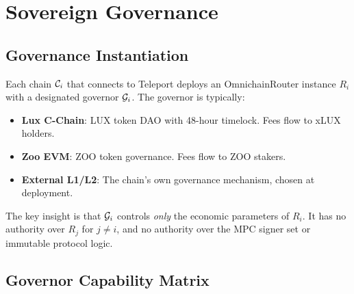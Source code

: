 \section{Sovereign Governance}

\label{sec:governance}

\subsection{Governance Instantiation}

Each chain $\mathcal{C}_i$ that connects to Teleport deploys an OmnichainRouter instance $R_i$ with a designated governor $\mathcal{G}_i$. The governor is typically:

\begin{itemize}[nosep]
  \item \textbf{Lux C-Chain}: LUX token DAO with 48-hour timelock. Fees flow to xLUX holders.
  \item \textbf{Zoo EVM}: ZOO token governance. Fees flow to ZOO stakers.
  \item \textbf{External L1/L2}: The chain's own governance mechanism, chosen at deployment.
\end{itemize}

\noindent
The key insight is that $\mathcal{G}_i$ controls \emph{only} the economic parameters of $R_i$. It has no authority over $R_j$ for $j \neq i$, and no authority over the MPC signer set or immutable protocol logic.

\subsection{Governor Capability Matrix}

